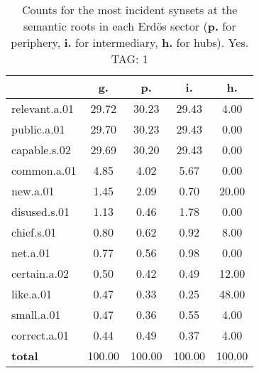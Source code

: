 \begin{table}[h!]
\begin{center}
\begin{tabular}{| l | c | c | c | c |}\hline
 & g. & p. & i. & h. \\\hline
relevant.a.01 & 29.72  & 30.23  & 29.43  & 4.00 \\\hline
public.a.01 & 29.70  & 30.23  & 29.43  & 0.00 \\\hline
capable.s.02 & 29.69  & 30.20  & 29.43  & 0.00 \\\hline
common.a.01 & 4.85  & 4.02  & 5.67  & 0.00 \\\hline
new.a.01 & 1.45  & 2.09  & 0.70  & 20.00 \\\hline
disused.s.01 & 1.13  & 0.46  & 1.78  & 0.00 \\\hline
chief.s.01 & 0.80  & 0.62  & 0.92  & 8.00 \\\hline
net.a.01 & 0.77  & 0.56  & 0.98  & 0.00 \\\hline
certain.a.02 & 0.50  & 0.42  & 0.49  & 12.00 \\\hline
like.a.01 & 0.47  & 0.33  & 0.25  & 48.00 \\\hline
small.a.01 & 0.47  & 0.36  & 0.55  & 4.00 \\\hline
correct.a.01 & 0.44  & 0.49  & 0.37  & 4.00 \\\hline
{{\bf total}} & 100.00  & 100.00  & 100.00  & 100.00 \\\hline
\end{tabular}
\caption{Counts for the most incident synsets at the semantic roots in each Erd\"os sector ({\bf p.} for periphery, {\bf i.} for intermediary, {\bf h.} for hubs). Yes. TAG: 1}
\end{center}
\end{table}